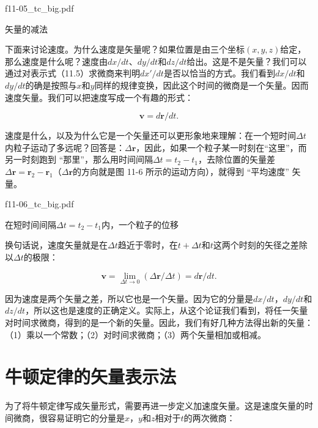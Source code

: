 \documentclass[12pt,oneside]{book}
\providecommand{\FLPvec}[1]{\boldsymbol{#1}}
\providecommand{\FLPr}[0]{\FLPvec{r}}
\providecommand{\FLPv}[0]{\FLPvec{v}}
\begin{document}
\begin{fig}{f11-05_tc_big.pdf}
\caption{矢量的减法}
\label{fig:图11-5}
\end{fig}


下面来讨论速度。为什么速度是矢量呢？如果位置是由三个坐标$(x, y, z)$给定，那么速度是什么呢？速度由$dx/dt$、$dy/dt$和$dz/dt$给出。这是不是矢量？我们可以通过对表示式（11.5）求微商来判明$dx'/dt$是否以恰当的方式。我们看到$dx/dt$和$dy/dt$的确是按照与$x$和$y$同样的规律变换，因此这个时间的微商是一个矢量。因而速度矢量。我们可以把速度写成一个有趣的形式：

\begin{equation*}
\FLPv=d\FLPr/dt.
\end{equation*}

速度是什么，以及为什么它是一个矢量还可以更形象地来理解：在一个短时间$\Delta t$内粒子运动了多远呢？回答是：$\Delta\boldsymbol{r}$，因此，如果一个粒子某一时刻在“这里”，而另一时刻跑到 “那里”，那么用时间间隔$\Delta t = t_2 - t_1$，去除位置的矢量差$\Delta\boldsymbol{r} = \boldsymbol{r}_2 - \boldsymbol{r}_1$（$\Delta\boldsymbol{r}$的方向就是图 11-6 所示的运动方向），就得到 “平均速度” 矢量。

\begin{fig}{f11-06_tc_big.pdf}
\caption{在短时间间隔$ \Delta t = t_2 - t_1 $内，一个粒子的位移}
\label{fig:图11-6}
\end{fig}



换句话说，速度矢量就是在$\Delta t$趋近于零时，在$t + \Delta t$和$t$这两个时刻的矢径之差除以$\Delta t$的极限：


\begin{equation}
\label{Eq:I:11:10}
\FLPv=\lim_{\Delta t\to0}(\Delta\FLPr/\Delta t)=d\FLPr/dt.
\end{equation}

因为速度是两个矢量之差，所以它也是一个矢量。因为它的分量是$dx/dt$，$dy/dt$和$dz/dt$，所以这也是速度的正确定义。实际上，从这个论证我们看到，将任一矢量对时间求微商，得到的是一个新的矢量。因此，我们有好几种方法得出新的矢量：（1）乘以一个常数；（2）对时间求微商；（3）两个矢量相加或相减。



\section{牛顿定律的矢量表示法}
为了将牛顿定律写成矢量形式，需要再进一步定义加速度矢量。这是速度矢量的时间微商，很容易证明它的分量是$x$，$y$和$z$相对于$t$的两次微商：
\end{document}
